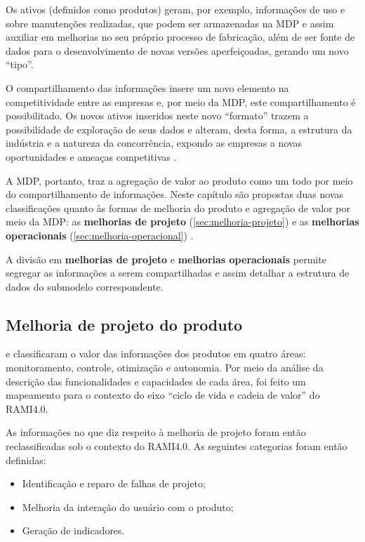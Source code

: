 Os ativos (definidos como produtos) geram, por exemplo, informações de uso e sobre manutenções realizadas, que podem ser armazenadas na MDP e assim auxiliar em melhorias no seu próprio processo de fabricação, além de ser fonte de dados para o desenvolvimento de novas versões aperfeiçoadas, gerando um novo ``tipo''.

O compartilhamento das informações insere um novo elemento na competitividade entre as empresas \cite{framling2013plm} e, por meio da MDP, este compartilhamento é possibilitado. Os novos ativos inseridos neste novo ``formato'' trazem a possibilidade de exploração de seus dados e alteram, desta forma, a estrutura da indústria e a natureza da concorrência, expondo as empresas a novas oportunidades e ameaças competitivas \cite{porter2014smartproducts}.

A MDP, portanto, traz a agregação de valor ao produto como um todo por meio do compartilhamento de informações. Neste capítulo são propostas duas novas classificações quanto às formas de melhoria do produto e agregação de valor por meio da MDP: as \textbf{melhorias de projeto} (\autoref{sec:melhoria-projeto}) e as \textbf{melhorias operacionais} (\autoref{sec:melhoria-operacional}) .

A divisão em \textbf{melhorias de projeto} e \textbf{melhorias operacionais} permite segregar as informações a serem compartilhadas e assim detalhar a estrutura de dados do submodelo correspondente.

\subsection{Melhoria de projeto do produto}
\label{sec:melhoria-projeto}

 e  classificaram o valor das informações dos produtos em quatro áreas: monitoramento, controle, otimização e autonomia. Por meio da análise da descrição das funcionalidades e capacidades de cada área, foi feito um mapeamento para o contexto do eixo ``ciclo de vida e cadeia de valor'' do RAMI4.0.

As informações no que diz respeito à melhoria de projeto foram então reclassificadas sob o contexto do RAMI4.0. As seguintes categorias foram então definidas:

\begin{itemize}
	\item Identificação e reparo de falhas de projeto;
	\item Melhoria da interação do usuário com o produto;
	\item Geração de indicadores.
\end{itemize}

